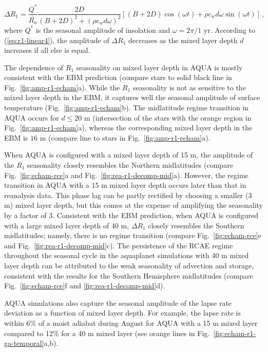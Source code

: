 \documentclass{ametsocV5}
\begin{document}
  \begin{equation} \label{eq:r1-linear4}
    \Delta R_{1} = \frac{Q^{*}}{\overline{R_{a}}}\frac{2D}{(B+2D)^{2}+(\rho c_w d \omega)^{2}}\left[(B+2D)\cos(\omega t)+\rho c_w d \omega \sin(\omega t)\right] \, ,
  \end{equation}
  where $Q^*$ is the seasonal amplitude of insolation and $\omega=2\pi/1$ yr. According to (\ref{eq:r1-linear4}), the amplitude of $\Delta R_1$ decreases as the mixed layer depth $d$ increases if all else is equal. 

  The dependence of $R_1$ seasonality on mixed layer depth in AQUA is mostly consistent with the EBM prediction (compare stars to solid black line in Fig.~\ref{fig:amp-r1-echam}a). While the $R_1$ seasonality is not as sensitive to the mixed layer depth in the EBM, it captures well the seasonal amplitude of surface temperature (Fig.~\ref{fig:amp-r1-echam}b). The midlatitude regime transition in AQUA occurs for $d \le 20$ m (intersection of the stars with the orange region in Fig.~\ref{fig:amp-r1-echam}a), whereas the corresponding mixed layer depth in the EBM is $16$ m (compare line to stars in Fig.~\ref{fig:amp-r1-echam}a).

  When AQUA is configured with a mixed layer depth of 15 m, the amplitude of the \(R_{1}\) seasonality closely resembles the Northern midlatitudes (compare Fig.~\ref{fig:echam-rce}a and Fig.~\ref{fig:rea-r1-decomp-mid}a). However, the regime transition in AQUA with a 15 m mixed layer depth occurs later than that in reanalysis data. This phase lag can be partly rectified by choosing a smaller (3 m) mixed layer depth, but this comes at the expense of amplifying the seasonality by a factor of 3. Consistent with the EBM prediction, when AQUA is configured with a large mixed layer depth of 40 m, \(\Delta R_{1}\) closely resembles the Southern midlatitudes; namely, there is no regime transition (compare Fig.~\ref{fig:echam-rce}e and Fig.~\ref{fig:rea-r1-decomp-mid}c). The persistence of the RCAE regime throughout the seasonal cycle in the aquaplanet simulations with 40 m mixed layer depth can be attributed to the weak seasonality of advection and storage, consistent with the results for the Southern Hemisphere midlatitudes (compare Fig.~\ref{fig:echam-rce}f and \ref{fig:rea-r1-decomp-mid}d).

  AQUA simulations also capture the seasonal amplitude of the lapse rate deviation as a function of mixed layer depth. For example, the lapse rate is within 6\% of a moist adiabat during August for AQUA with a 15 m mixed layer compared to 12\% for a 40 m mixed layer (see orange lines in Fig.~\ref{fig:echam-r1-ga-temporal}a,b).
\end{document}
